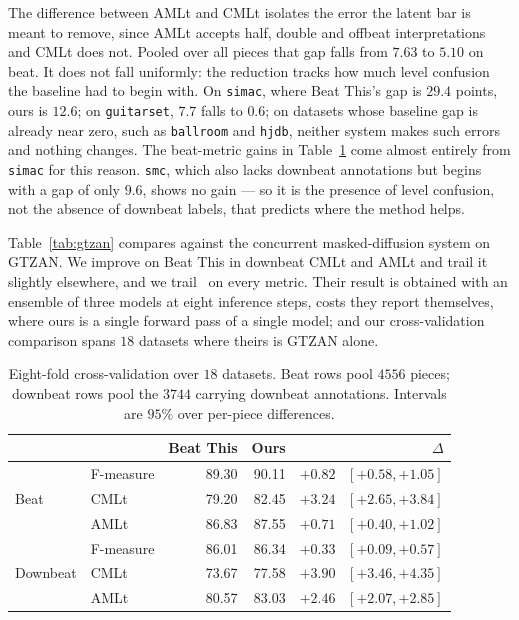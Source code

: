 The difference between AMLt and CMLt isolates the error the latent bar is meant to remove, since AMLt accepts half, double and offbeat interpretations and CMLt does not. Pooled over all pieces that gap falls from $7.63$ to $5.10$ on beat. It does not fall uniformly: the reduction tracks how much level confusion the baseline had to begin with. On \texttt{simac}, where Beat This's gap is $29.4$ points, ours is $12.6$; on \texttt{guitarset}, $7.7$ falls to $0.6$; on datasets whose baseline gap is already near zero, such as \texttt{ballroom} and \texttt{hjdb}, neither system makes such errors and nothing changes. The beat-metric gains in Table~\ref{tab:cv} come almost entirely from \texttt{simac} for this reason. \texttt{smc}, which also lacks downbeat annotations but begins with a gap of only $9.6$, shows no gain --- so it is the presence of level confusion, not the absence of downbeat labels, that predicts where the method helps.

Table~\ref{tab:gtzan} compares against the concurrent masked-diffusion system on GTZAN. We improve on Beat This in downbeat CMLt and AMLt and trail it slightly elsewhere, and we trail~\cite{foscarin2026masked} on every metric. Their result is obtained with an ensemble of three models at eight inference steps, costs they report themselves, where ours is a single forward pass of a single model; and our cross-validation comparison spans $18$ datasets where theirs is GTZAN alone.

\begin{table}[t]
  \centering
  \caption{Eight-fold cross-validation over $18$ datasets. Beat rows pool $4556$ pieces; downbeat rows pool the $3744$ carrying downbeat annotations. Intervals are $95\%$ over per-piece differences.}
  \label{tab:cv}
  \begin{tabular}{llrrr}
    \hline
     & & Beat This & Ours & $\Delta$ \\
    \hline
    \multirow{3}{*}{Beat}     & F-measure & 89.30 & 90.11 & $+0.82$ \, {\footnotesize$[+0.58, +1.05]$} \\
                              & CMLt      & 79.20 & 82.45 & $+3.24$ \, {\footnotesize$[+2.65, +3.84]$} \\
                              & AMLt      & 86.83 & 87.55 & $+0.71$ \, {\footnotesize$[+0.40, +1.02]$} \\
    \hline
    \multirow{3}{*}{Downbeat} & F-measure & 86.01 & 86.34 & $+0.33$ \, {\footnotesize$[+0.09, +0.57]$} \\
                              & CMLt      & 73.67 & 77.58 & $+3.90$ \, {\footnotesize$[+3.46, +4.35]$} \\
                              & AMLt      & 80.57 & 83.03 & $+2.46$ \, {\footnotesize$[+2.07, +2.85]$} \\
    \hline
  \end{tabular}
\end{table}

